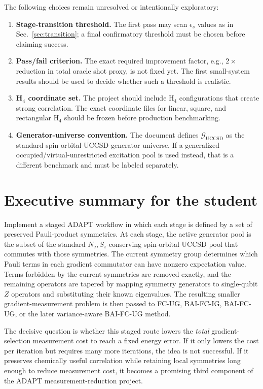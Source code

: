 \documentclass[11pt]{article}
\newcommand{\nelec}{N_{\mathrm e}}
\newcommand{\sz}{S_z}
\newcommand{\uccsd}{\mathcal G_{\mathrm{UCCSD}}}
\begin{document}
The following choices remain unresolved or intentionally exploratory:
\begin{enumerate}[label=(\arabic*),leftmargin=2.4em]
    \item \textbf{Stage-transition threshold.} The first pass may scan $\epsilon_s$ values as in Sec.~\ref{sec:transition}; a final confirmatory threshold must be chosen before claiming success.
    \item \textbf{Pass/fail criterion.} The exact required improvement factor, e.g., $2\times$ reduction in total oracle shot proxy, is not fixed yet. The first small-system results should be used to decide whether such a threshold is realistic.
    \item \textbf{H$_4$ coordinate set.} The project should include H$_4$ configurations that create strong correlation. The exact coordinate files for linear, square, and rectangular H$_4$ should be frozen before production benchmarking.
    \item \textbf{Generator-universe convention.} The document defines $\uccsd$ as the standard spin-orbital UCCSD generator universe. If a generalized occupied/virtual-unrestricted excitation pool is used instead, that is a different benchmark and must be labeled separately.
\end{enumerate}

\section{Executive summary for the student}

Implement a staged ADAPT workflow in which each stage is defined by a set of preserved Pauli-product symmetries. At each stage, the active generator pool is the subset of the standard $\nelec,\sz$-conserving spin-orbital UCCSD pool that commutes with those symmetries. The current symmetry group determines which Pauli terms in each gradient commutator can have nonzero expectation value. Terms forbidden by the current symmetries are removed exactly, and the remaining operators are tapered by mapping symmetry generators to single-qubit $Z$ operators and substituting their known eigenvalues. The resulting smaller gradient-measurement problem is then passed to FC-UG, BAI-FC-IG, BAI-FC-UG, or the later variance-aware BAI-FC-UG method.

The decisive question is whether this staged route lowers the \emph{total} gradient-selection measurement cost to reach a fixed energy error. If it only lowers the cost per iteration but requires many more iterations, the idea is not successful. If it preserves chemically useful correlation while retaining local symmetries long enough to reduce measurement cost, it becomes a promising third component of the ADAPT measurement-reduction project.
\end{document}

